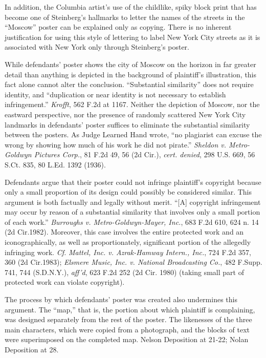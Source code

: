 In addition, the Columbia artist's use of the childlike, spiky block print that
has become one of Steinberg's hallmarks to letter the names of the streets in
the ``Moscow'' poster can be explained only as copying. There is no inherent
justification for using this style of lettering to label New York City streets
as it is associated with New York only through Steinberg's poster.

While defendants' poster shows the city of Moscow on the horizon in far greater
detail than anything is depicted in the background of plaintiff's illustration,
this fact alone cannot alter the conclusion. ``Substantial similarity'' does not
require identity, and ``duplication or near identity is not necessary to
establish infringement.'' \textit{Krofft}, 562 F.2d at 1167. Neither the
depiction of Moscow, nor the eastward perspective, nor the presence of randomly
scattered New York City landmarks in defendants' poster suffices to eliminate
the substantial similarity between the posters. As Judge Learned Hand wrote,
``no plagiarist can excuse the wrong by showing how much of his work he did not
pirate.'' \textit{Sheldon v. Metro-Goldwyn Pictures Corp.}, 81 F.2d 49, 56 (2d
Cir.), \textit{cert. denied}, 298 U.S. 669, 56 S.Ct. 835, 80 L.Ed. 1392 (1936).

Defendants argue that their poster could not infringe plaintiff's copyright
because only a small proportion of its design could possibly be considered
similar. This argument is both factually and legally without merit. ``[A]
copyright infringement may occur by reason of a substantial similarity that
involves only a small portion of each work.'' \textit{Burroughs v.
Metro-Goldwyn-Mayer, Inc.}, 683 F.2d 610, 624 n. 14 (2d Cir.1982). Moreover,
this case involves the entire protected work and an iconographically, as well as
proportionately, significant portion of the allegedly infringing work.
\textit{Cf.} \textit{Mattel, Inc. v. Azrak-Hamway Intern., Inc.}, 724 F.2d 357,
360 (2d Cir.1983); \textit{Elsmere Music, Inc. v. National Broadcasting Co.},
482 F.Supp. 741, 744 (S.D.N.Y.), \textit{aff'd}, 623 F.2d 252 (2d Cir. 1980)
(taking small part of protected work can violate copyright).

The process by which defendants' poster was created also undermines this
argument. The ``map,'' that is, the portion about which plaintiff is
complaining, was designed separately from the rest of the poster. The likenesses
of the three main characters, which were copied from a photograph, and the
blocks of text were superimposed on the completed map. Nelson Deposition at
21-22; Nolan Deposition at 28.


